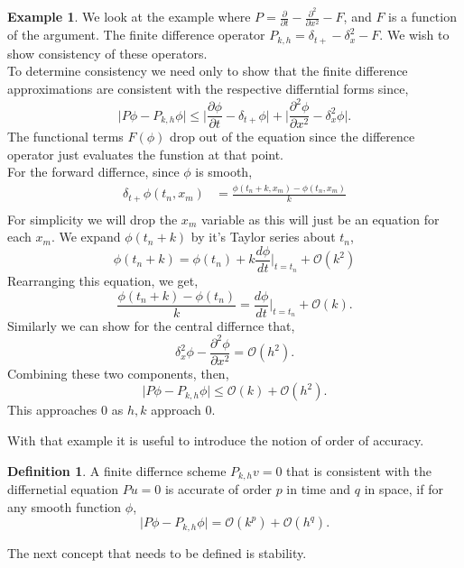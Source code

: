 \documentclass[12pt]{article}
\renewcommand{\O}{\mathcal{O}}
\theoremstyle{definition}
\newtheorem{exmp}{Example}[section]
\newtheorem{definition}{Definition}
\begin{document}
\begin{exmp}
We look at the example where $P=\frac{\partial}{\partial t}-\frac{\partial^2}{\partial x^2}-F$, and $F$ is a function of the argument. The finite difference operator $P_{k,h}=\delta_{t+}-\delta_x^2-F$. We wish to show consistency of these operators.\\
To determine consistency we need only to show that the finite difference approximations are consistent with the respective differntial forms since, 
\begin{equation}
\lvert P\phi-P_{k,h}\phi\rvert\leq \lvert \frac{\partial\phi}{\partial t}-\delta_{t+}\phi\rvert+\lvert \frac{\partial^2\phi}{\partial x^2} -\delta_x^2 \phi\rvert. 
\end{equation}
The functional terms $F(\phi)$ drop out of the equation since the difference operator just evaluates the funstion at that point. \\
For the forward differnce, since $\phi$ is smooth,
\begin{align*}
\delta_{t+}\phi(t_n,x_m)&=\frac{\phi(t_n+k,x_m)-\phi(t_n,x_m)}{k}\\
\end{align*}
For simplicity we will drop the $x_m$ variable as this will just be an equation for each $x_m$. We expand $\phi(t_n+k)$ by it's Taylor series about $t_n$,
$$\phi(t_n+k)=\phi(t_n)+k\frac{d\phi}{dt}\bigg\rvert_{t=t_n}+\mathcal{O}(k^2)$$
Rearranging this equation, we get,
\begin{equation}
\frac{\phi(t_n+k)-\phi(t_n)}{k}=\frac{d\phi}{dt}\bigg\rvert_{t=t_n}+\mathcal{O}(k). 
\end{equation}
Similarly we can show for the central differnce that,
\begin{equation}
\delta_x^2\phi-\frac{\partial^2\phi}{\partial x^2}=\mathcal{O}(h^2).
\end{equation} 
Combining these two components, then,
\begin{equation}
\lvert P\phi-P_{k,h}\phi\rvert\leq\mathcal{O}(k)+\O(h^2). 
\end{equation}
This approaches 0 as $h,k$ approach $0$. 
\end{exmp}

With that example it is useful to introduce the notion of order of accuracy. 
\begin{definition}
A finite differnce scheme $P_{k,h}v=0$ that is consistent with the differnetial equation $Pu=0$ is accurate of order $p$ in time and $q$ in space, if  for any smooth function $\phi$,
$$ \lvert P\phi-P_{k,h}\phi\rvert=\O(k^p)+\O(h^q). $$
\end{definition}
The next concept that needs to be defined is stability.
\end{document}

